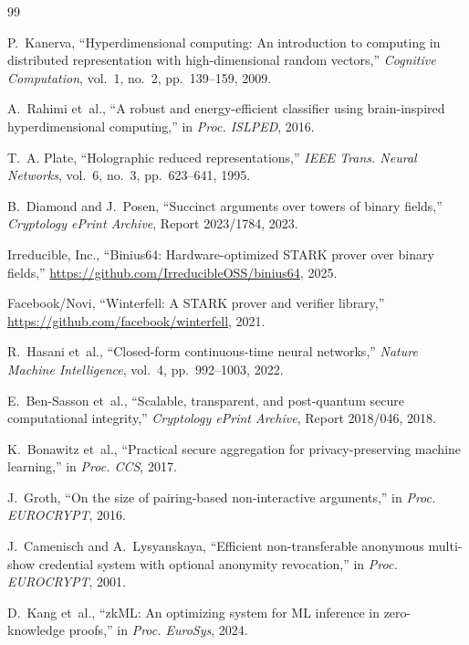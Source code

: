 \documentclass[11pt,twocolumn]{article}
\begin{document}


\begin{thebibliography}{99}

P.~Kanerva, ``Hyperdimensional computing: An introduction to computing in distributed representation with high-dimensional random vectors,'' \emph{Cognitive Computation}, vol.~1, no.~2, pp.~139--159, 2009.

A.~Rahimi et~al., ``A robust and energy-efficient classifier using brain-inspired hyperdimensional computing,'' in \emph{Proc. ISLPED}, 2016.

T.~A. Plate, ``Holographic reduced representations,'' \emph{IEEE Trans. Neural Networks}, vol.~6, no.~3, pp.~623--641, 1995.

B.~Diamond and J.~Posen, ``Succinct arguments over towers of binary fields,'' \emph{Cryptology ePrint Archive}, Report 2023/1784, 2023.

Irreducible, Inc., ``Binius64: Hardware-optimized STARK prover over binary fields,'' \url{https://github.com/IrreducibleOSS/binius64}, 2025.

Facebook/Novi, ``Winterfell: A STARK prover and verifier library,'' \url{https://github.com/facebook/winterfell}, 2021.

R.~Hasani et~al., ``Closed-form continuous-time neural networks,'' \emph{Nature Machine Intelligence}, vol.~4, pp.~992--1003, 2022.

E.~Ben-Sasson et~al., ``Scalable, transparent, and post-quantum secure computational integrity,'' \emph{Cryptology ePrint Archive}, Report 2018/046, 2018.

K.~Bonawitz et~al., ``Practical secure aggregation for privacy-preserving machine learning,'' in \emph{Proc. CCS}, 2017.

J.~Groth, ``On the size of pairing-based non-interactive arguments,'' in \emph{Proc. EUROCRYPT}, 2016.

J.~Camenisch and A.~Lysyanskaya, ``Efficient non-transferable anonymous multi-show credential system with optional anonymity revocation,'' in \emph{Proc. EUROCRYPT}, 2001.

D.~Kang et~al., ``zkML: An optimizing system for ML inference in zero-knowledge proofs,'' in \emph{Proc. EuroSys}, 2024.


\end{thebibliography}
\end{document}
